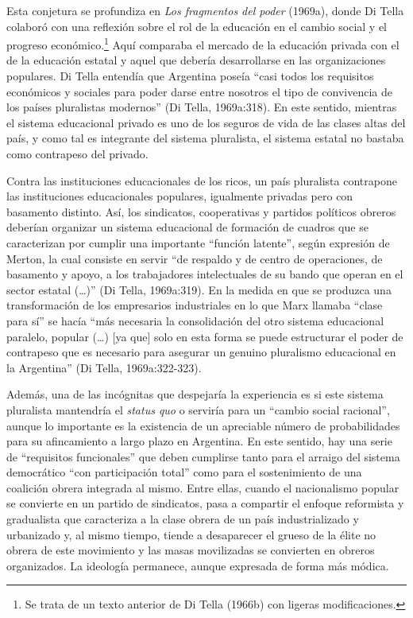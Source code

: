 Esta conjetura se profundiza en \emph{Los fragmentos del poder} (1969a), donde Di Tella colaboró con una reflexión sobre el rol de la educación en el cambio social y el progreso económico.\footnote{Se trata de un texto anterior de Di Tella (1966b) con ligeras modificaciones.} Aquí comparaba el mercado de la educación privada con el de la educación estatal y aquel que debería desarrollarse en las organizaciones populares. Di Tella entendía que Argentina poseía \enquote{casi todos los requisitos económicos y sociales para poder darse entre nosotros el tipo de convivencia de los países pluralistas modernos} (Di Tella, 1969a:318). En este sentido, mientras el sistema educacional privado es uno de los seguros de vida de las clases altas del país, y como tal es integrante del sistema pluralista, el sistema estatal no bastaba como contrapeso del privado.

Contra las instituciones educacionales de los ricos, un país pluralista contrapone las instituciones educacionales populares, igualmente privadas pero con basamento distinto. Así, los sindicatos, cooperativas y partidos políticos obreros deberían organizar un sistema educacional de formación de cuadros que se caracterizan por cumplir una importante \enquote{función latente}, según expresión de Merton, la cual consiste en servir \enquote{de respaldo y de centro de operaciones, de basamento y apoyo, a los trabajadores intelectuales de su bando que operan en el sector estatal (\dots)} (Di Tella, 1969a:319). En la medida en que se produzca una transformación de los empresarios industriales en lo que Marx llamaba \enquote{clase para sí} se hacía \enquote{más necesaria la consolidación del otro sistema educacional paralelo, popular (\dots) [ya que] solo en esta forma se puede estructurar el poder de contrapeso que es necesario para asegurar un genuino pluralismo educacional en la Argentina} (Di Tella, 1969a:322-323).

Además, una de las incógnitas que despejaría la experiencia es si este sistema pluralista mantendría el \emph{status quo} o serviría para un \enquote{cambio social racional}, aunque lo importante es la existencia de un apreciable número de probabilidades para su afincamiento a largo plazo en Argentina. En este sentido, hay una serie de \enquote{requisitos funcionales} que deben cumplirse tanto para el arraigo del sistema democrático \enquote{con participación total} como para el sostenimiento de una coalición obrera integrada al mismo. Entre ellas, cuando el nacionalismo popular se convierte en un partido de sindicatos, pasa a compartir el enfoque reformista y gradualista que caracteriza a la clase obrera de un país industrializado y urbanizado y, al mismo tiempo, tiende a desaparecer el grueso de la élite no obrera de este movimiento y las masas movilizadas se convierten en obreros organizados. La ideología permanece, aunque expresada de forma más módica.

